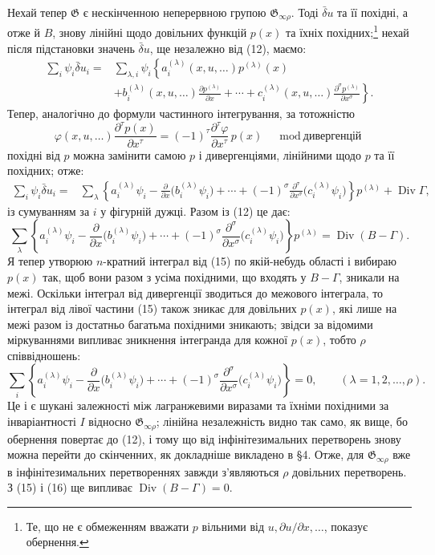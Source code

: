 \documentclass[11pt]{article}
\providecommand{\G}{\mathfrak G}
\providecommand{\p}{\partial}
\DeclareMathOperator{\Div}{Div}
\providecommand{\bd}{\bar{\delta}}
\begin{document}
Нехай тепер \(\G\) є нескінченною неперервною групою \(\G_{\infty\rho}\). Тоді \(\bd u\) та її похідні, а отже й \(B\), знову лінійні щодо довільних функцій \(p(x)\) та їхніх похідних;\footnote{Те, що не є обмеженням вважати \(p\) вільними від \(u,\p u/\p x,\ldots\), показує обернення.} нехай після підстановки значень \(\bd u\), ще незалежно від (12), маємо:
\[
\begin{aligned}
\sum_i\psi_i\bd u_i
={}&\sum_{\lambda,i}\psi_i\left\{
a_i^{(\lambda)}(x,u,\ldots)p^{(\lambda)}(x)\right.\\
&\left.
+b_i^{(\lambda)}(x,u,\ldots)\frac{\p p^{(\lambda)}}{\p x}
+\cdots+c_i^{(\lambda)}(x,u,\ldots)
\frac{\p^\sigma p^{(\lambda)}}{\p x^\sigma}\right\}.
\end{aligned}
\]
Тепер, аналогічно до формули частинного інтегрування, за тотожністю
\[
\varphi(x,u,\ldots)\frac{\p^\tau p(x)}{\p x^\tau}
=(-1)^\tau\frac{\p^\tau\varphi}{\p x^\tau}\,p(x)
\quad \bmod \text{дивергенцій}
\]
похідні від \(p\) можна замінити самою \(p\) і дивергенціями, лінійними щодо \(p\) та її похідних; отже:
\begin{equation}
\begin{aligned}
\sum_i\psi_i\bd u_i
={}&\sum_\lambda\left\{
a_i^{(\lambda)}\psi_i-\frac{\p}{\p x}\bigl(b_i^{(\lambda)}\psi_i\bigr)
+\cdots+(-1)^\sigma
\frac{\p^\sigma}{\p x^\sigma}\bigl(c_i^{(\lambda)}\psi_i\bigr)
\right\}p^{(\lambda)}+\Div\Gamma,
\end{aligned}
\tag{14}
\end{equation}
із сумуванням за \(i\) у фігурній дужці. Разом із (12) це дає:
\begin{equation}
\sum_\lambda\left\{
a_i^{(\lambda)}\psi_i-\frac{\p}{\p x}\bigl(b_i^{(\lambda)}\psi_i\bigr)
+\cdots+(-1)^\sigma
\frac{\p^\sigma}{\p x^\sigma}\bigl(c_i^{(\lambda)}\psi_i\bigr)
\right\}p^{(\lambda)}
=\Div(B-\Gamma).
\tag{15}
\end{equation}
Я тепер утворюю \(n\)-кратний інтеграл від (15) по якій-небудь області і вибираю \(p(x)\) так, щоб вони разом з усіма похідними, що входять у \(B-\Gamma\), зникали на межі. Оскільки інтеграл від дивергенції зводиться до межового інтеграла, то інтеграл від лівої частини (15) також зникає для довільних \(p(x)\), які лише на межі разом із достатньо багатьма похідними зникають; звідси за відомими міркуваннями випливає зникнення інтегранда для кожної \(p(x)\), тобто \(\rho\) співвідношень:
\begin{equation}
\sum_i\left\{
a_i^{(\lambda)}\psi_i-\frac{\p}{\p x}\bigl(b_i^{(\lambda)}\psi_i\bigr)
+\cdots+(-1)^\sigma
\frac{\p^\sigma}{\p x^\sigma}\bigl(c_i^{(\lambda)}\psi_i\bigr)
\right\}=0,\qquad(\lambda=1,2,\ldots,\rho).
\tag{16}
\end{equation}
Це і є шукані залежності між лагранжевими виразами та їхніми похідними за інваріантності \(I\) відносно \(\G_{\infty\rho}\); лінійна незалежність видно так само, як вище, бо обернення повертає до (12), і тому що від інфінітезимальних перетворень знову можна перейти до скінченних, як докладніше викладено в \S{}4. Отже, для \(\G_{\infty\rho}\) вже в інфінітезимальних перетвореннях завжди з'являються \(\rho\) довільних перетворень. З (15) і (16) ще випливає \(\Div(B-\Gamma)=0\).
\end{document}

